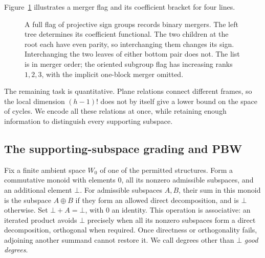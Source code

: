 Figure~\ref{fig:merger-tree} illustrates a merger flag and its coefficient
bracket for four lines.

\begin{figure}[ht]
\centering
{}
\caption{A full flag of projective sign groups records binary mergers.
The left tree determines its coefficient functional.  The two children
at the root each have even parity, so interchanging them changes its
sign.  Interchanging the two leaves of either bottom pair does not.
The list is in merger order; the oriented subgroup flag has increasing
ranks $1,2,3$, with the implicit one-block merger omitted.}
\label{fig:merger-tree}
\end{figure}

The remaining task is quantitative.  Plane relations connect different
frames, so the local dimension $(h-1)!$ does not by itself give a lower
bound on the space of cycles.  We encode all these relations at once,
while retaining enough information to distinguish every supporting
subspace.

\subsection{The supporting-subspace grading and PBW}

Fix a finite ambient space $W_0$ of one of the permitted structures.
Form a commutative monoid with elements $0$, all its nonzero admissible
subspaces, and an additional element $\bot$.  For admissible subspaces
$A,B$, their sum in this monoid is the subspace $A\oplus B$ if they form
an allowed direct decomposition, and is $\bot$ otherwise.  Set
$\bot+A=\bot$, with $0$ an identity.  This operation is associative:
an iterated product avoids $\bot$ precisely when all its nonzero
subspaces form a direct decomposition, orthogonal when required.
Once directness or orthogonality fails, adjoining another summand cannot
restore it.  We call degrees other than $\bot$ \emph{good degrees}.

